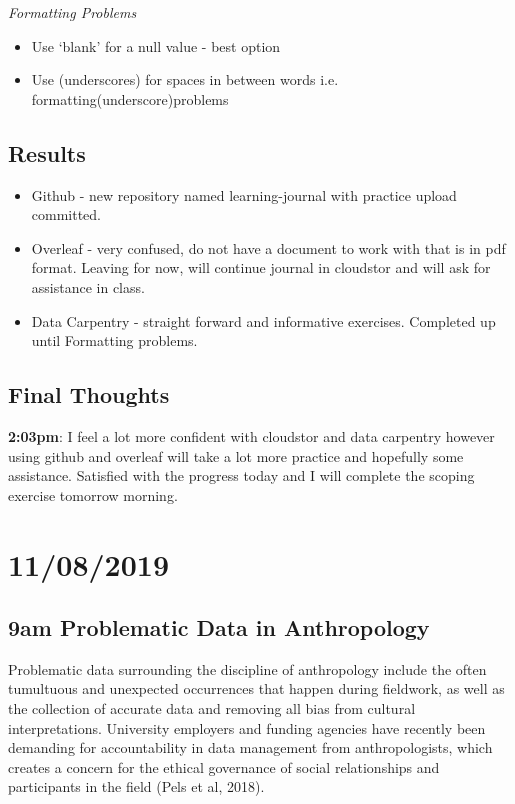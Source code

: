 \documentclass{article}
\begin{document}
\textit{Formatting Problems}

\begin{itemize}
\item Use ‘blank’ for a null value - best option
\item Use (underscores) for spaces in between words i.e. formatting(underscore)problems
\end{itemize}\subsection{Results}

\begin{itemize}
\item Github - new repository named learning-journal with practice upload committed. 
\item Overleaf - very confused, do not have a document to work with that is in pdf format. Leaving for now, will continue journal in cloudstor and will ask for assistance in class. 
\item Data Carpentry - straight forward and informative exercises. Completed up until Formatting problems.
\end{itemize}

\subsection{Final Thoughts}

\textbf{2:03pm}: I feel a lot more confident with cloudstor and data carpentry however using github and overleaf will take a lot more practice and hopefully some assistance. Satisfied with the progress today and I will complete the scoping exercise tomorrow morning.


\section{11/08/2019}

\subsection{9am Problematic Data in Anthropology}

Problematic data surrounding the discipline of anthropology include the often tumultuous and unexpected occurrences that happen during fieldwork, as well as the collection of accurate data and removing all bias from cultural interpretations. University employers and funding agencies have recently been demanding for accountability in data management from anthropologists, which creates a concern for the ethical governance of social relationships and participants in the field (Pels et al, 2018).
\end{document}
